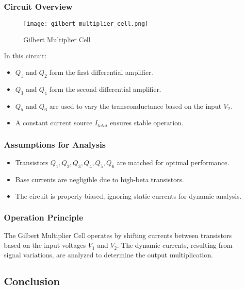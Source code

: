 \subsubsection{Circuit Overview}

\begin{figure}[h]
    \centering
    \texttt{[image: gilbert\_multiplier\_cell.png]}
    \caption{Gilbert Multiplier Cell}
    \label{fig:gilbert_multiplier}
\end{figure}

In this circuit:

\begin{itemize}
    \item \( Q_1 \) and \( Q_2 \) form the first differential amplifier.
    \item \( Q_3 \) and \( Q_4 \) form the second differential amplifier.
    \item \( Q_5 \) and \( Q_6 \) are used to vary the transconductance based on the input \( V_2 \).
    \item A constant current source \( I_{total} \) ensures stable operation.
\end{itemize}

\subsubsection{Assumptions for Analysis}

\begin{itemize}
    \item Transistors \( Q_1, Q_2, Q_3, Q_4, Q_5, Q_6 \) are matched for optimal performance.
    \item Base currents are negligible due to high-beta transistors.
    \item The circuit is properly biased, ignoring static currents for dynamic analysis.
\end{itemize}

\subsubsection{Operation Principle}

The Gilbert Multiplier Cell operates by shifting currents between transistors based on the input voltages \( V_1 \) and \( V_2 \). The dynamic currents, resulting from signal variations, are analyzed to determine the output multiplication.

\subsection{Conclusion}

